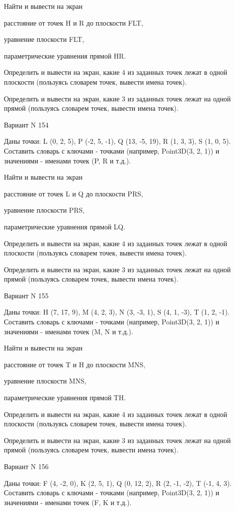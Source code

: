 \documentclass[11pt]{report}
\begin{document}
Найти и вывести на экран


расстояние от точек H и R до плоскости FLT,


уравнение плоскости FLT,


параметрические уравнения прямой HR.


Определить и вывести на экран, какие 4 из заданных точек лежат в одной плоскости (пользуясь словарем точек, вывести имена точек).


Определить и вывести на экран, какие 3 из заданных точек лежат на одной прямой (пользуясь словарем точек, вывести имена точек).

\newpage
Вариант N 154

Даны точки: L (0, 2, 5), P (-2, 5, -1), Q (13, -5, 19), R (1, 3, 3), S (1, 0, 5).
Составить словарь с ключами - точками (например, Point3D(3, 2, 1)) и значениями - именами точек (P, R и т.д.).


Найти и вывести на экран


расстояние от точек L и Q до плоскости PRS,


уравнение плоскости PRS,


параметрические уравнения прямой LQ.


Определить и вывести на экран, какие 4 из заданных точек лежат в одной плоскости (пользуясь словарем точек, вывести имена точек).


Определить и вывести на экран, какие 3 из заданных точек лежат на одной прямой (пользуясь словарем точек, вывести имена точек).

\newpage
Вариант N 155

Даны точки: H (7, 17, 9), M (4, 2, 3), N (3, -3, 1), S (4, 1, -3), T (1, 2, -1).
Составить словарь с ключами - точками (например, Point3D(3, 2, 1)) и значениями - именами точек (M, N и т.д.).


Найти и вывести на экран


расстояние от точек T и H до плоскости MNS,


уравнение плоскости MNS,


параметрические уравнения прямой TH.


Определить и вывести на экран, какие 4 из заданных точек лежат в одной плоскости (пользуясь словарем точек, вывести имена точек).


Определить и вывести на экран, какие 3 из заданных точек лежат на одной прямой (пользуясь словарем точек, вывести имена точек).

\newpage
Вариант N 156

Даны точки: F (4, -2, 0), K (2, 5, 1), Q (0, 12, 2), R (2, -1, -2), T (-1, 4, 3).
Составить словарь с ключами - точками (например, Point3D(3, 2, 1)) и значениями - именами точек (F, K и т.д.).
\end{document}
